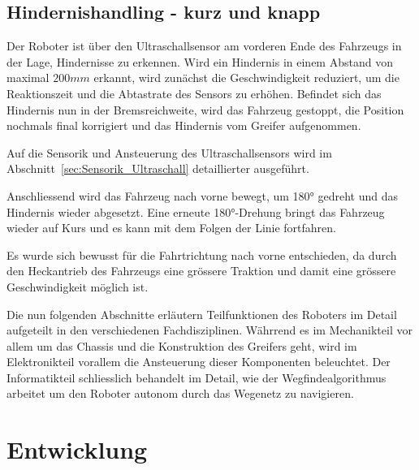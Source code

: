 \documentclass[main.tex]{subfiles} %
\begin{document}

\subsection{Hindernishandling - kurz und knapp}

Der Roboter ist über den Ultraschallsensor am vorderen Ende des Fahrzeugs in
der Lage, Hindernisse zu erkennen. Wird ein Hindernis in einem Abstand von
maximal $200 mm$ erkannt, wird zunächst die Geschwindigkeit reduziert, um die
Reaktionszeit und die Abtastrate des Sensors zu erhöhen. Befindet sich das
Hindernis nun in der Bremsreichweite, wird das Fahrzeug gestoppt, die Position
nochmals final korrigiert und das Hindernis vom Greifer aufgenommen.

Auf die Sensorik und Ansteuerung des Ultraschallsensors wird im
Abschnitt~\ref{sec:Sensorik_Ultraschall} detaillierter ausgeführt.

Anschliessend wird das Fahrzeug nach vorne bewegt, um 180° gedreht und das
Hindernis wieder abgesetzt. Eine erneute 180°-Drehung bringt das Fahrzeug
wieder auf Kurs und es kann mit dem Folgen der Linie fortfahren.

Es wurde sich bewusst für die Fahrtrichtung nach vorne entschieden, da durch
den Heckantrieb des Fahrzeugs eine grössere Traktion und damit eine grössere
Geschwindigkeit möglich ist.


Die nun folgenden Abschnitte erläutern Teilfunktionen des Roboters im Detail
aufgeteilt in den verschiedenen Fachdisziplinen. Währrend es im Mechanikteil
vor allem um das Chassis und die Konstruktion des Greifers geht, wird im
Elektronikteil vorallem die Ansteuerung dieser Komponenten beleuchtet. Der
Informatikteil schliesslich behandelt im Detail, wie der Wegfindealgorithmus
arbeitet um den Roboter autonom durch das Wegenetz zu navigieren.

\section{Entwicklung}


\newpage


\newpage


\newpage
\end{document}
